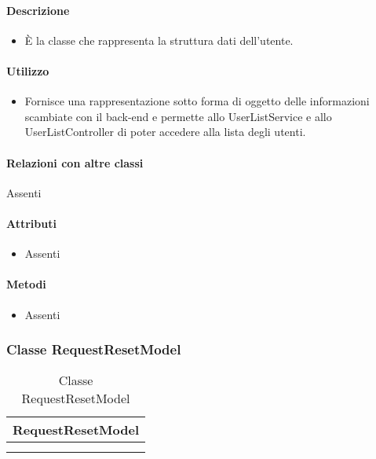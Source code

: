 \paragraph*{Descrizione}
\begin{itemize}
\item[] È la classe che rappresenta la struttura dati dell'utente.
\end{itemize}

\paragraph*{Utilizzo}
\begin{itemize}
\item[] Fornisce una rappresentazione sotto forma di oggetto delle informazioni scambiate con il back-end e permette allo UserListService e allo UserListController di poter accedere alla lista degli utenti.
\end{itemize}

\paragraph*{Relazioni con altre classi}
Assenti

\paragraph*{Attributi}
\begin{itemize}
\item[] Assenti
\end{itemize}

\paragraph*{Metodi}
\begin{itemize}
\item[] Assenti
\end{itemize}

\subsubsection{Classe RequestResetModel}

\begin{table}[ht]
\begin{center}
\bgroup
\setlength{\arrayrulewidth}{0.6mm}
\def\arraystretch{1}
\begin{tabular}{ | p{12cm} | }
\hline
\centerline{\textbf{RequestResetModel}}
\\ \hline
 \\ 
\hline
 \\ 
\hline
\end{tabular}
\egroup
\caption{Classe RequestResetModel}
\end{center}
\end{table}

